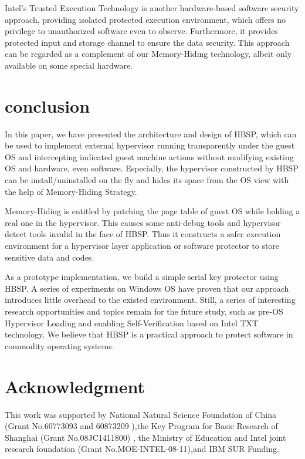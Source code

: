 \documentclass[conference]{IEEEtran}
\begin{document}
{Intel's Trusted Execution Technology\cite{IEEEhowto:17} is another
hardware-based software security approach, providing isolated
protected execution environment, which offers no privilege to
unauthorized software even to observe. Furthermore, it provides
protected input and storage channel to ensure the data security.
This approach can be regarded as a complement of our Memory-Hiding
technology, albeit only available on some special hardware.

\bigskip

\section{conclusion}
In this paper, we have presented the architecture and design of
HBSP, which can be used to implement external hypervisor running
transparently under the guest OS and intercepting indicated guest
machine actions without modifying existing OS and hardware, even
software. Especially, the hypervisor constructed by HBSP can be
install/uninstalled on the fly and hides its space from the OS
view with the help of Memory-Hiding Strategy.

Memory-Hiding is entitled by patching the page table of guest OS
while holding a real one in the hypervisor. This causes some
anti-debug tools and hypervisor detect tools invalid in the face
of HBSP. Thus it constructs a safer execution environment for a
hypervisor layer application or software protector to store
sensitive data and codes.

As a prototype implementation, we build a simple serial key
protector using HBSP. A series of experiments on Windows OS have
proven that our approach introduces little overhead to the existed
environment. Still, a series of interesting research opportunities
and topics remain for the future study, such as pre-OS Hypervisor
Loading and enabling Self-Verification based on Intel TXT
technology. We believe that HBSP is a practical approach to protect
software in commodity operating systems.
\bigskip

\section*{Acknowledgment}
This work was supported by National Natural Science Foundation of
China (Grant No.60773093 and 60873209 ),the Key  Program for
Basic Research of Shanghai (Grant No.08JC1411800) , the Ministry
of Education and Intel joint research foundation (Grant
No.MOE-INTEL-08-11),and IBM SUR Funding.

}
\end{document}
